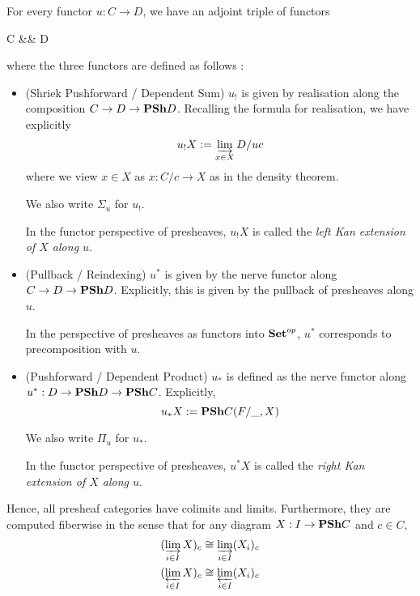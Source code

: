 \documentclass{article}
\begin{document}
\begin{prop}

  For every functor $u : C \to D$,
  we have an adjoint triple of functors
  \begin{cd}
    { C} && { D}
    \arrow["{u^*}"{description}, from=1-3, to=1-1]
    \arrow["{u_*}"{description}, shift right=10, from=1-1, to=1-3]
    \arrow["{u_!}"{description}, shift left=10, from=1-1, to=1-3]
    \arrow["\bot"{description}, shift left=5, draw=none, from=1-1, to=1-3]
    \arrow["\bot"{description}, shift right=5, draw=none, from=1-1, to=1-3]
  \end{cd}  
  where the three functors are defined as follows : 
  \begin{itemize}
    \item (Shriek Pushforward / Dependent Sum)
    $u_!$ is given by realisation along the composition
    $C \to D \to \mathbf{PSh} D$.
    Recalling the formula for realisation, we have explicitly
    \[
      u_! X := \varinjlim_{x \in X} D / u c
    \]
    where we view $x \in X$ as $x : C / c \to X$ as in the density theorem.

    We also write $\Sigma_u$ for $u_!$.

    In the functor perspective of presheaves,
    $u_! X$ is called the \emph{left Kan extension of $X$ along $u$}.

    \item (Pullback / Reindexing)
    $u^*$ is given by the nerve functor along
    $C \to D \to \mathbf{PSh} D$.
    Explicitly, this is given by the pullback of presheaves along $u$.

    In the perspective of presheaves as functors into $\mathbf{Set}^{op}$,
    $u^*$ corresponds to precomposition with $u$.
    \item (Pushforward / Dependent Product)
    $u_*$ is defined as the nerve functor along $u^* : D \to \mathbf{PSh} D \to \mathbf{PSh} C$.
    Explicitly,
    \[
      u_* X := \mathbf{PSh} C ( F / \_ , X)
    \]

    We also write $\Pi_u$ for $u_*$.

    In the functor perspective of presheaves,
    $u^* X$ is called the \emph{right Kan extension of $X$ along $u$}.
    
  \end{itemize}

  Hence, 
  all presheaf categories have colimits and limits.
  Furthermore, they are computed fiberwise in the sense that
  for any diagram $X : I \to \mathbf{PSh} C$ and $c \in C$,
  \begin{align*}
    (\varinjlim_{i \in I} X)_c \cong \varinjlim_{i \in I} (X_i)_c \\
    (\varprojlim_{i \in I} X)_c \cong \varprojlim_{i \in I} (X_i)_c
  \end{align*}
\end{prop}
\end{document}
